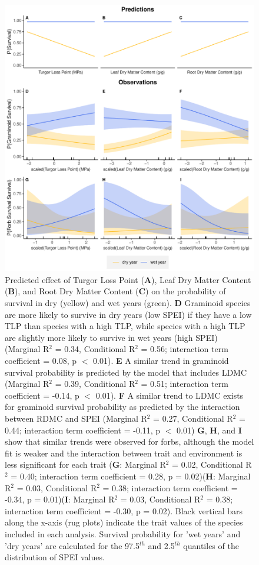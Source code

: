\documentclass[12pt, letterpaper]{article}
\begin{document}
\begin{figure}
\includegraphics[width=.9\textwidth]{images/PredResultsRugPlot.pdf}
\caption[width=0.35\textwidth]{\small{Predicted effect of Turgor Loss Point (\textbf{A}), Leaf Dry Matter Content (\textbf{B}), and Root Dry Matter Content (\textbf{C}) on the probability of survival in dry (yellow) and wet years (green). \textbf{D} Graminoid species are more likely to survive in dry years (low SPEI) if they have a low TLP than species with a high TLP, while species with a high TLP are slightly more likely to survive in wet years (high SPEI) (Marginal R$^2$ = 0.34, Conditional R$^2$ = 0.56; interaction term coefficient = 0.08, p $<$ 0.01). \textbf{E} A similar trend in graminoid survival probability is predicted by the model that includes LDMC (Marginal R$^2$ = 0.39, Conditional R$^2$ = 0.51; interaction term coefficient = -0.14, p $<$ 0.01). \textbf{F} A similar trend to LDMC exists for graminoid survival probability as predicted by the interaction between RDMC and SPEI (Marginal R$^2$ = 0.27, Conditional R$^2$ = 0.44; interaction term coefficient = -0.11, p $<$ 0.01)
\textbf{G}, \textbf{H}, and \textbf{I} show that similar trends were observed for forbs, although the model fit is weaker and the interaction between trait and environment is less significant for each trait (\textbf{G}: Marginal R$^2$ = 0.02, Conditional R$^2$ = 0.40; interaction term coefficient = 0.28, p = 0.02)(\textbf{H}: Marginal R$^2$ = 0.03, Conditional R$^2$ = 0.38; interaction term coefficient = -0.34, p = 0.01)(\textbf{I}: Marginal R$^2$ = 0.03, Conditional R$^2$ = 0.38; interaction term coefficient = -0.30, p = 0.02). Black vertical bars along the x-axis (rug plots) indicate the trait values of the species included in each analysis. Survival probability for 'wet years' and 'dry years' are calculated for the 97.5$^{th}$ and 2.5$^{th}$ quantiles of the distribution of SPEI values.
}}
\label{fig:PredsObs}
\end{figure}
\end{document}
